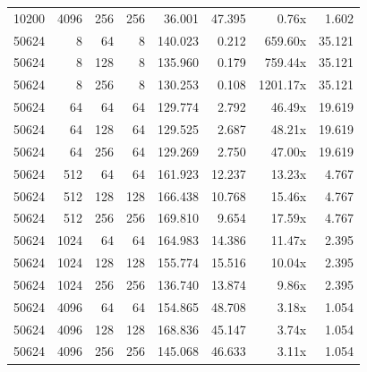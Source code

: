 {\begin{longtable}{rrrrrrrr}
10200 & 4096 & 256 & 256 & 36.001 & 47.395 & 0.76x & 1.602\\
50624 & 8 & 64 & 8 & 140.023 & 0.212 & 659.60x & 35.121\\
50624 & 8 & 128 & 8 & 135.960 & 0.179 & 759.44x & 35.121\\
50624 & 8 & 256 & 8 & 130.253 & 0.108 & 1201.17x & 35.121\\
50624 & 64 & 64 & 64 & 129.774 & 2.792 & 46.49x & 19.619\\
50624 & 64 & 128 & 64 & 129.525 & 2.687 & 48.21x & 19.619\\
50624 & 64 & 256 & 64 & 129.269 & 2.750 & 47.00x & 19.619\\
50624 & 512 & 64 & 64 & 161.923 & 12.237 & 13.23x & 4.767\\
50624 & 512 & 128 & 128 & 166.438 & 10.768 & 15.46x & 4.767\\
50624 & 512 & 256 & 256 & 169.810 & 9.654 & 17.59x & 4.767\\
50624 & 1024 & 64 & 64 & 164.983 & 14.386 & 11.47x & 2.395\\
50624 & 1024 & 128 & 128 & 155.774 & 15.516 & 10.04x & 2.395\\
50624 & 1024 & 256 & 256 & 136.740 & 13.874 & 9.86x & 2.395\\
50624 & 4096 & 64 & 64 & 154.865 & 48.708 & 3.18x & 1.054\\
50624 & 4096 & 128 & 128 & 168.836 & 45.147 & 3.74x & 1.054\\
50624 & 4096 & 256 & 256 & 145.068 & 46.633 & 3.11x & 1.054\\
\end{longtable}
}

